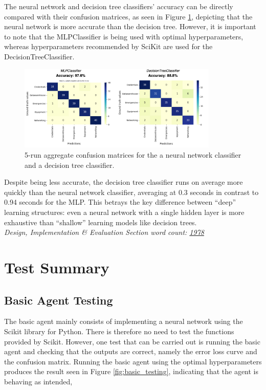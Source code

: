 \documentclass[letterpaper,12pt]{article}
\begin{document}
The neural network and decision tree classifiers' accuracy can be directly compared with their confusion matrices, as seen in Figure \ref{fig:evaluation_mlp_dt}, depicting that the neural network is more accurate than the decision tree. However, it is important to note that the MLPClassifier is being used with optimal hyperparameters, whereas hyperparameters recommended by SciKit are used for the DecisionTreeClassifier.

\begin{figure}[h] 
\centerline{\includegraphics[width=0.85\textwidth]{report/figures/evaluation_mlp_dt.png}}
\caption{\label{fig:evaluation_mlp_dt}5-run aggregate confusion matrices for the a neural network classifier and a decision tree classifier.}
\end{figure}

Despite being less accurate, the decision tree classifier runs on average more quickly than the neural network classifier, averaging at 0.3 seconds in contrast to 0.94 seconds for the MLP. This betrays the key difference between ``deep'' learning structures: even a neural network with a single hidden layer is more exhaustive than ``shallow'' learning models like decision trees.\\

\textit{Design, Implementation \& Evaluation Section word count: \underline{1978}}

\clearpage
\section{Test Summary}
\label{sec:test-summary}

\subsection{Basic Agent Testing}

The basic agent mainly consists of implementing a neural network using the Scikit library for Python. There is therefore no need to test the functions provided by Scikit. However, one test that can be carried out is running the basic agent and checking that the outputs are correct, namely the error loss curve and the confusion matrix. Running the basic agent using the optimal hyperparameters produces the result seen in Figure \ref{fig:basic_testing}, indicating that the agent is behaving as intended,
\end{document}
